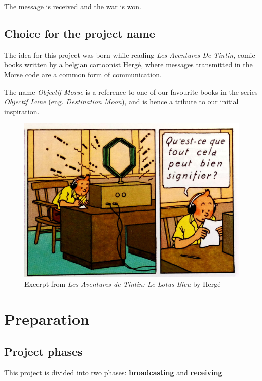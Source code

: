\documentclass[12pt]{report}
\begin{document}
The message is received and the war is won.

\subsection{Choice for the project name}

The idea for this project was born while reading \textit{Les Aventures De Tintin}, comic books written by a belgian cartoonist Hergé, where messages transmitted in the Morse code are a common form of communication. 

The name \textit{Objectif Morse} is a reference to one of our favourite books in the series \textit{Objectif Lune} \cite{objectif_lune} (eng. \textit{Destination Moon}), and is hence a tribute to our initial inspiration.

\begin{figure}[H]
\centering\includegraphics[scale=0.1]{le_lotus_bleu}
\caption{Excerpt from \textit{Les Aventures de Tintin: Le Lotus Bleu} by Hergé \cite{le_lotus_bleu}}			
\label{fig:tintin}
\end{figure}

\section{Preparation} \label{sec:equip}

\subsection{Project phases}

This project is divided into two phases: \textbf{broadcasting} and \textbf{receiving}. 
\end{document}
